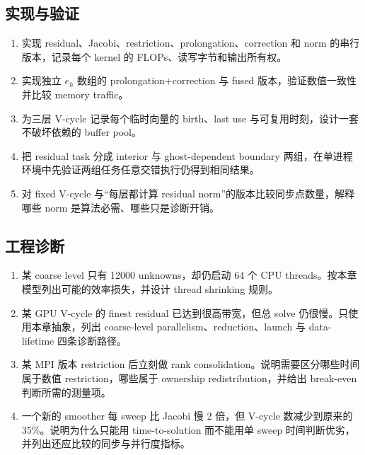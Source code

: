 \subsection*{实现与验证}
\begin{enumerate}[label=\arabic*.]
\item 实现 residual、Jacobi、restriction、prolongation、correction 和 norm 的串行版本，记录每个 kernel 的 FLOPs、读写字节和输出所有权。
\item 实现独立 $e_h$ 数组的 prolongation+correction 与 fused 版本，验证数值一致性并比较 memory traffic。
\item 为三层 V-cycle 记录每个临时向量的 birth、last use 与可复用时刻，设计一套不破坏依赖的 buffer pool。
\item 把 residual task 分成 interior 与 ghost-dependent boundary 两组，在单进程环境中先验证两组任务任意交错执行仍得到相同结果。
\item 对 fixed V-cycle 与“每层都计算 residual norm”的版本比较同步点数量，解释哪些 norm 是算法必需、哪些只是诊断开销。
\end{enumerate}

\subsection*{工程诊断}
\begin{enumerate}[label=\arabic*.]
\item 某 coarse level 只有 12000 unknowns，却仍启动 64 个 CPU threads。按本章模型列出可能的效率损失，并设计 thread shrinking 规则。
\item 某 GPU V-cycle 的 finest residual 已达到很高带宽，但总 solve 仍很慢。只使用本章抽象，列出 coarse-level parallelism、reduction、launch 与 data-lifetime 四条诊断路径。
\item 某 MPI 版本 restriction 后立刻做 rank consolidation。说明需要区分哪些时间属于数值 restriction，哪些属于 ownership redistribution，并给出 break-even 判断所需的测量项。
\item 一个新的 smoother 每 sweep 比 Jacobi 慢 2 倍，但 V-cycle 数减少到原来的 35\%。说明为什么只能用 time-to-solution 而不能用单 sweep 时间判断优劣，并列出还应比较的同步与并行度指标。
\end{enumerate}
